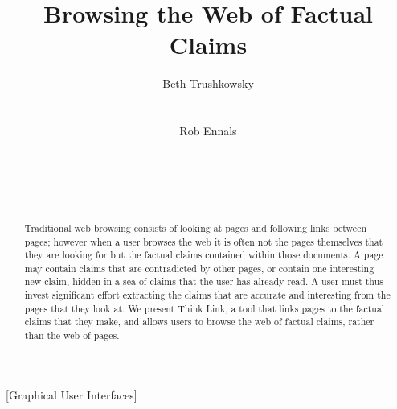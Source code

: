 \documentclass{chi2009}
\begin{document}
\setlength{\paperheight}{11in}
\setlength{\paperwidth}{8.5in}
\setlength{\pdfpageheight}{\paperheight}
\setlength{\pdfpagewidth}{\paperwidth}
%

\title{Browsing the Web of Factual Claims}


\author{
\alignauthor Beth Trushkowsky\\
       \\
       \\
\alignauthor Rob Ennals\\
       \\
       \\
       \\
       \\
}

\sloppy 

\maketitle

\begin{abstract}

Traditional web browsing consists of looking at pages and following links between pages; however when a user browses the web it is often not the pages themselves that they are looking for but the factual claims contained within those documents. A page may contain claims that are contradicted by other pages, or contain one interesting new claim, hidden in a sea of claims that the user has already read. A user must thus invest significant effort extracting the claims that are accurate and interesting from the pages that they look at.
We present Think Link, a tool that links pages to the factual claims that they make, and allows users to browse the web of factual claims, rather than the web of pages.

\end{abstract}


[Graphical User Interfaces]
\end{document}
